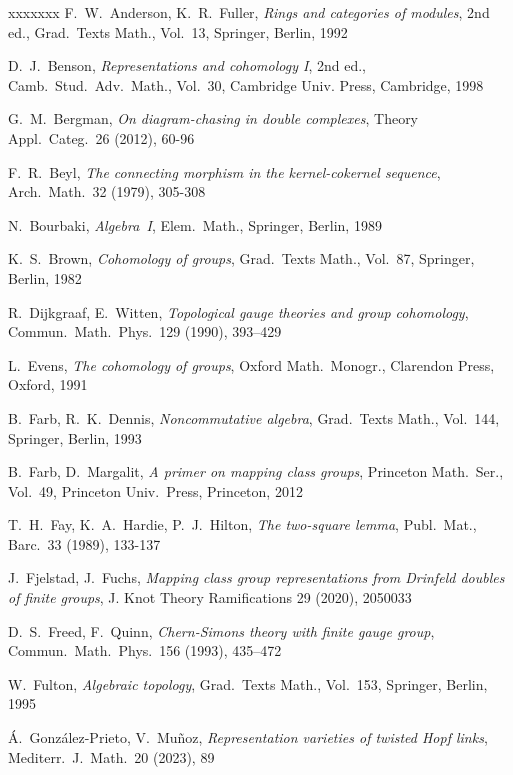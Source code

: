 \documentclass[12pt]{article}
\theoremstyle{definition}
\theoremstyle{break}
\renewcommand{\1}{\mathbbm{1}}
\begin{document}
\begin{thebibliography}{xxxxxxx}
F.~W.~Anderson, K.~R.~Fuller,
\emph{Rings and categories of modules}, 2nd ed.,
Grad.~Texts Math., Vol.~13, Springer, Berlin, 1992

D.~J.~Benson,
\emph{Representations and cohomology I}, 2nd ed.,
Camb.\ Stud.\ Adv.\ Math., Vol.~30, Cambridge Univ. Press, Cambridge, 1998

G.~M.~Bergman,
\emph{On diagram-chasing in double complexes},
Theory Appl.\ Categ.~26 (2012), 60-96

 F.~R.~Beyl,
\emph{The connecting morphism in the kernel-cokernel sequence},
Arch.~Math.~32 (1979), 305-308

N.~Bourbaki,
\emph{Algebra~I},
Elem.~Math., Springer, Berlin, 1989

K.~S.~Brown,
\emph{Cohomology of groups},
Grad.~Texts Math., Vol.~87, Springer, Berlin, 1982

R.~Dijkgraaf, E.~Witten,
\emph{Topological gauge theories and group cohomology},
Commun.~Math.~Phys.~129 (1990), 393--429

L.~Evens,
\emph{The cohomology of groups},
Oxford Math.~Monogr., Clarendon Press, Oxford, 1991

B.~Farb, R.~K.~Dennis,
\emph{Noncommutative algebra}, 
Grad.~Texts Math., Vol.~144, Springer, Berlin, 1993

B.~Farb, D.~Margalit,
\emph{A primer on mapping class groups},
Princeton Math.\ Ser., Vol.~49, Princeton Univ.\ Press, Princeton, 2012

T.~H.~Fay, K.~A.~Hardie, P.~J.~Hilton,
\emph{The two-square lemma},
Publ.~Mat., Barc.~33 (1989), 133-137

J.~Fjelstad, J.~Fuchs,
\emph{Mapping class group representations from Drinfeld doubles of finite groups},
J. Knot Theory Ramifications 29 (2020), 2050033

D.~S.~Freed, F.~Quinn,
\emph{Chern-Simons theory with finite gauge group},
Commun.~Math.~Phys.~156 (1993), 435--472

W.~Fulton,
\emph{Algebraic topology},
Grad.~Texts Math., Vol.~153, Springer, Berlin, 1995

\'{A}.~Gonz\'{a}lez-Prieto, V.~Mu\~{n}oz,
\emph{Representation varieties of twisted Hopf links},
Mediterr.~J.~Math.~20 (2023), 89


\end{thebibliography}
\end{document}
